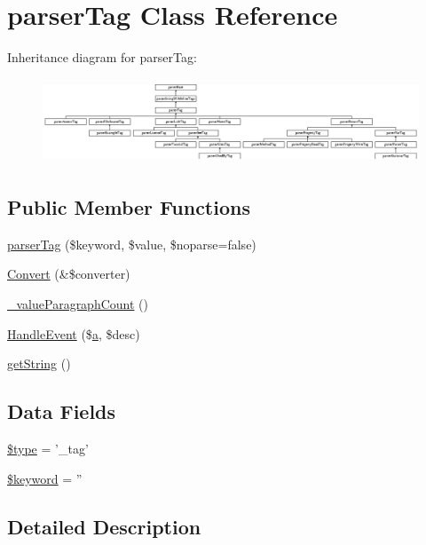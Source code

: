 \hypertarget{classparser_tag}{\section{parser\-Tag \-Class \-Reference}
\label{classparser_tag}
}
\-Inheritance diagram for parser\-Tag\-:\begin{figure}[H]
\begin{center}
\leavevmode
\includegraphics[height=2.547109cm]{classparser_tag}
\end{center}
\end{figure}
\subsection*{\-Public \-Member \-Functions}
\begin{DoxyCompactItemize}
\item 
\hyperlink{classparser_tag_a5c5c6ec6df856dbadce53281dcfb665d}{parser\-Tag} (\$keyword, \$value, \$noparse=false)
\item 
\hyperlink{classparser_tag_a31e57fd66b58b300f8a489aa1b9431f6}{\-Convert} (\&\$converter)
\item 
\hyperlink{classparser_tag_aae11335592fc37fa1dd8441092bfb2b8}{\-\_\-value\-Paragraph\-Count} ()
\item 
\hyperlink{classparser_tag_adad166e90cd004e55cb685e890ef1c8e}{\-Handle\-Event} (\$\hyperlink{classa}{a}, \$desc)
\item 
\hyperlink{classparser_tag_afde980915cc78c408e6ac75b662e631c}{get\-String} ()
\end{DoxyCompactItemize}
\subsection*{\-Data \-Fields}
\begin{DoxyCompactItemize}
\item 
\hyperlink{classparser_tag_a9a4a6fba2208984cabb3afacadf33919}{\$type} = '\-\_\-tag'
\item 
\hyperlink{classparser_tag_a4a925d6b38bcf3957c713a7d3dc7da1f}{\$keyword} = ''
\end{DoxyCompactItemize}


\subsection{\-Detailed \-Description}


